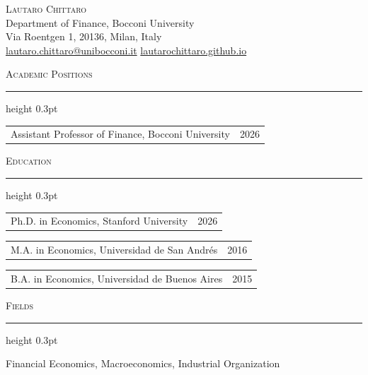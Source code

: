 \documentclass[12pt]{article}
\makeatletter
\newlength{\bodyindent}\setlength{\bodyindent}{1.65cm}
\newlength{\bodywidth}\setlength{\bodywidth}{\dimexpr\textwidth-\bodyindent\relax}
\newcommand{\cvsec}[1]{%
  \par
  \vspace{1.05em}%
  {\scshape\large #1}\par
  \vspace{0.15em}%
  {\color{rulegray}\hrule height 0.3pt}%
  \vspace{0.6em}%
}
\newcommand{\yr}[2]{%
  \par\noindent
  \begin{tabularx}{\textwidth}{@{}X@{\hspace{1.5em}}r@{}}
    #2 & {\small #1}
  \end{tabularx}\par}
\makeatother
\begin{document}
\pagestyle{empty}

\begin{center}
  {\LARGE\scshape Lautaro Chittaro}\\[0.5em]
  Department of Finance, Bocconi University\\
  Via Roentgen 1, 20136, Milan, Italy\\[0.35em]
  \href{mailto:lautaro.chittaro@unibocconi.it}{lautaro.chittaro@unibocconi.it} \quad
  \href{https://lautarochittaro.github.io}{lautarochittaro.github.io}
\end{center}

\cvsec{Academic Positions}
\yr{2026}{Assistant Professor of Finance, Bocconi University}

\cvsec{Education}
\yr{2026}{Ph.D. in Economics, Stanford University}
\yr{2016}{M.A. in Economics, Universidad de San Andr\'es}
\yr{2015}{B.A. in Economics, Universidad de Buenos Aires}

%

\cvsec{Fields}
Financial Economics, Macroeconomics, Industrial Organization
\end{document}
